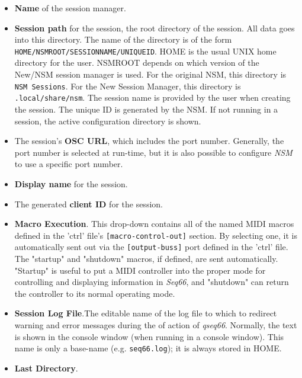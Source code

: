    \begin{itemize}
      \item \textbf{Name} of the session manager.
      \item \textbf{Session path} for the session,
         the root directory of the session.
         All data goes into this directory.
         The name of the directory is of the form
         \texttt{HOME/NSMROOT/SESSIONNAME/UNIQUEID}.
         HOME is the usual UNIX home directory for the user.
         NSMROOT depends on which version of the New/NSM session manager is
         used.
         For the original NSM, this directory is \texttt{NSM Sessions}.
         For the New Session Manager, this directory is
         \texttt{.local/share/nsm}.
         The session name is provided by the user when creating the
         session.
         The unique ID is generated by the NSM.
         If not running in a session,
         the active configuration directory is shown.
      \item The session's \textbf{OSC URL}, which includes the port number.
         Generally, the port number is selected at run-time, but it is also
         possible to configure \textsl{NSM} to use a specific port number.
      \item \textbf{Display name} for the session.
      \item The generated \textbf{client ID} for the session.
      \item \textbf{Macro Execution}.
         This drop-down contains all of the named MIDI macros
         defined in the 'ctrl' file's
         \texttt{[macro-control-out]} section.
         By selecting one, it is automatically sent out via the
         \texttt{[output-buss]} port defined in the 'ctrl' file.
         The "startup" and "shutdown" macros, if defined,
         are sent automatically. "Startup" is useful to put
         a MIDI controller into the proper mode for controlling and displaying
         information in \textsl{Seq66}, and "shutdown" can return the controller
         to its normal operating mode.
      \item \textbf{Session Log File}.The editable name of the log file
         to which to redirect warning
         and error messages during the of action of \textsl{qseq66}.
         Normally, the text is shown in the console window (when running in a
         console window). This name is only a base-name (e.g.
         \texttt{seq66.log}); it is always stored in HOME.
      \item \textbf{Last Directory}.

\end{itemize}
